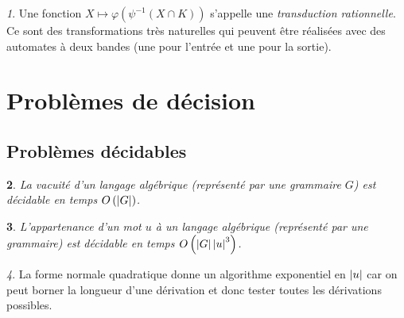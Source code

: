 \documentclass[10pt,a4paper,notitlepage]{article}
\theoremstyle{plain}
\newtheorem{thm}{\protect\theoremname}
\theoremstyle{definition}
\newtheorem{defn}[thm]{\protect\definitionname}
\theoremstyle{definition}
\theoremstyle{remark}
\theoremstyle{remark}
\newtheorem{rem}[thm]{\protect\remarkname}
\theoremstyle{plain}
\theoremstyle{plain}
\theoremstyle{plain}
\theoremstyle{remark}
\providecommand{\definitionname}{Définition}
\providecommand{\remarkname}{Remarque}
\providecommand{\theoremname}{Théorème}
\begin{document}
\begin{rem}
	Une fonction $X\mapsto\varphi\left(\psi^{-1}\left(X\cap K\right)\right)$
	s'appelle une \emph{transduction rationnelle}. Ce sont des transformations
	très naturelles qui peuvent être réalisées avec des automates à deux
	bandes (une pour l'entrée et une pour la sortie).
\end{rem}

%





\section{Problèmes de décision}

\subsection{Problèmes décidables}

\begin{thm}
	La vacuité d'un langage algébrique (représenté par une grammaire $G$) est décidable en temps $O\left(\left|G\right|\right)$.
\end{thm}

\begin{thm} %
	L'appartenance d'un mot $u$ à un langage algébrique (représenté par une grammaire) est décidable en temps $O\left(\left|G\right|\left|u\right|^{3}\right)$.
\end{thm}

\begin{rem}
	La forme normale quadratique donne un algorithme exponentiel en $\left|u\right|$ car on peut borner la longueur d'une dérivation et donc tester toutes les dérivations possibles.
\end{rem}

\end{document}
